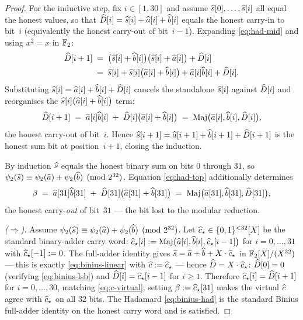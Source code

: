 \begin{proof}
For the inductive step, fix $i \in [1, 30]$ and assume $\widehat{s}[0],
\dots, \widehat{s}[i]$ all equal the honest values, so that $\widehat{D}[i] =
\widehat{s}[i] + \widehat{a}[i] + \widehat{b}[i]$ equals the honest carry-in to
bit~$i$ (equivalently the honest carry-out of bit~$i-1$). Expanding
\eqref{eq:had-mid} and using $x^2 = x$ in $\mathbb{F}_2$:
\begin{align*}
\widehat{D}[i+1] \;&=\; \bigl(\widehat{s}[i]+\widehat{b}[i]\bigr)\bigl(\widehat{s}[i]+\widehat{a}[i]\bigr) + \widehat{D}[i] \\
            \;&=\; \widehat{s}[i] + \widehat{s}[i]\bigl(\widehat{a}[i]+\widehat{b}[i]\bigr) + \widehat{a}[i]\widehat{b}[i] + \widehat{D}[i].
\end{align*}
Substituting $\widehat{s}[i] = \widehat{a}[i] + \widehat{b}[i] + \widehat{D}[i]$ cancels
the standalone $\widehat{s}[i]$ against $\widehat{D}[i]$ and reorganises the
$\widehat{s}[i]\bigl(\widehat{a}[i]+\widehat{b}[i]\bigr)$ term:
\begin{equation*}
\widehat{D}[i+1] \;=\; \widehat{a}[i]\widehat{b}[i] \;+\; \widehat{D}[i]\bigl(\widehat{a}[i]+\widehat{b}[i]\bigr)
            \;=\; \operatorname{Maj}\bigl(\widehat{a}[i], \widehat{b}[i], \widehat{D}[i]\bigr),
\end{equation*}
the honest carry-out of bit~$i$. Hence $\widehat{s}[i+1] = \widehat{a}[i+1] +
\widehat{b}[i+1] + \widehat{D}[i+1]$ is the honest sum bit at position~$i+1$,
closing the induction.

By induction $\widehat{s}$ equals the honest binary sum on bits $0$ through
$31$, so $\psi_2(\widehat{s}) \equiv \psi_2(\widehat{a}) + \psi_2(\widehat{b})
\pmod{2^{32}}$. Equation \eqref{eq:had-top} additionally determines
\begin{equation}\label{eq:beta-formula}
\beta \;=\; \widehat{a}[31]\widehat{b}[31] \;+\; \widehat{D}[31]\bigl(\widehat{a}[31]+\widehat{b}[31]\bigr)
       \;=\; \operatorname{Maj}\bigl(\widehat{a}[31], \widehat{b}[31], \widehat{D}[31]\bigr),
\end{equation}
the honest carry-\emph{out} of bit~$31$ — the bit lost to the modular
reduction.

\emph{($\Rightarrow$).} Assume $\psi_2(\widehat{s}) \equiv \psi_2(\widehat{a}) +
\psi_2(\widehat{b}) \pmod{2^{32}}$. Let $\widehat{c}_\star \in \{0,1\}^{<32}[X]$ be
the standard binary-adder carry word: $\widehat{c}_\star[i] :=
\operatorname{Maj}\bigl(\widehat{a}[i], \widehat{b}[i], \widehat{c}_\star[i-1]\bigr)$ for $i =
0,\dots,31$ with $\widehat{c}_\star[-1] := 0$. The full-adder identity
gives $\widehat{s} = \widehat{a} + \widehat{b} + X\cdot\widehat{c}_\star$ in $\mathbb{F}_2[X]/(X^{32})$ —
this is exactly \eqref{eq:binius-linear} with $\widehat{c} :=
\widehat{c}_\star$ — hence $\widehat{D} = X\cdot\widehat{c}_\star$: $\widehat{D}[0] = 0$
(verifying \eqref{eq:binius-lsb}) and $\widehat{D}[i] = \widehat{c}_\star[i-1]$
for $i \geq 1$. Therefore $\widehat{c}_\star[i] = \widehat{D}[i+1]$ for $i =
0,\dots,30$, matching \eqref{eq:c-virtual}; setting $\beta :=
\widehat{c}_\star[31]$ makes the virtual $\widehat{c}$ agree with $\widehat{c}_\star$
on all $32$ bits. The Hadamard \eqref{eq:binius-had} is the standard
Binius full-adder identity on the honest carry word and is satisfied.
\end{proof}

